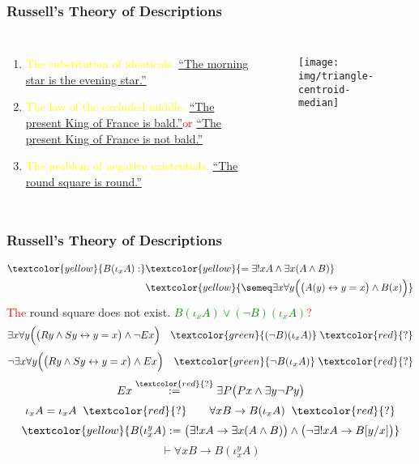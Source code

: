 \documentclass[UTF8,aspectratio=43,11pt,colorlinks,compress,openany]{beamer}%
\begin{document}
\begin{frame}\frametitle{Russell's Theory of Descriptions}
\begin{columns}
\begin{enumerate}
	\item \textcolor{yellow}{The substitution of identicals.}
	\underline{``The morning star is the evening star.''}
	\item \textcolor{yellow}{The law of the excluded middle.}
	\underline{``The present King of France is bald.''}\;\;\textcolor{red}{or}
	\underline{``The present King of France is not bald.''}
	\item \textcolor{yellow}{The problem of negative existentials.}
	\underline{``The round square is round.''}
\end{enumerate}
\begin{figure}
\texttt{[image: img/triangle-centroid-median]}
\end{figure}
\end{columns}
\end{frame}

\begin{frame}\frametitle{Russell's Theory of Descriptions}
\begin{align*}
\textcolor{yellow}{B(\iota_x A):}&\textcolor{yellow}{=\exists! x A\wedge\exists x(A\wedge B)}\\
&\textcolor{yellow}{\semeq\exists x\forall y\Big(\big(A(y)\leftrightarrow y=x\big)\wedge B(x)\Big)}
\end{align*}
\textcolor{red}{The} round square does not exist. \textcolor{green}{$B(\iota_x A)\vee(\neg B)(\iota_x A)$}\;\textcolor{red}{?}
\[\exists x\forall y\Big(\big(Ry\wedge Sy\leftrightarrow y=x\big)\wedge\neg Ex\Big)\quad\textcolor{green}{(\neg B)(\iota_x A)}\;\textcolor{red}{?}\]
\[\neg\exists x\forall y\Big(\big(Ry\wedge Sy\leftrightarrow y=x\big)\wedge Ex\Big)\quad\textcolor{green}{\neg B(\iota_x A)}\;\textcolor{red}{?}\]
\[Ex\stackrel{\textcolor{red}{?}}{:=}\exists P\big(Px\wedge\exists y\neg Py\big)\]
\[\iota_x A=\iota_x A\;\;\textcolor{red}{?}\qquad \forall x B\to B(\iota_x A)\;\;\textcolor{red}{?}\]
\[\textcolor{yellow}{B(\iota_x^y A):=\big(\exists!x A\to\exists x(A\wedge B)\big)\wedge\big(\neg\exists!x A\to B[y/x]\big)}\]
\[\vdash\forall x B\to B(\iota_x^y A)\]
\end{frame}
\end{document}
